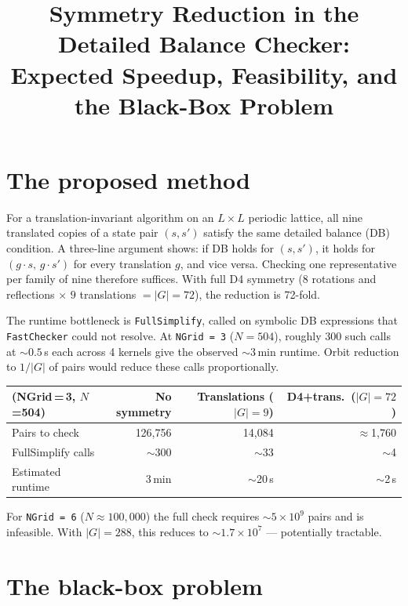 \documentclass[11pt,a4paper]{article}
\title{Symmetry Reduction in the Detailed Balance Checker:\\
\large Expected Speedup, Feasibility, and the Black-Box Problem}
\author{}
\date{}
\begin{document}
\maketitle

\section{The proposed method}

For a translation-invariant algorithm on an $L\times L$ periodic lattice,
all nine translated copies of a state pair $(s, s')$ satisfy the same
detailed balance (DB) condition.  A three-line argument shows: if DB holds
for $(s,s')$, it holds for $(g{\cdot}s,\,g{\cdot}s')$ for every
translation $g$, and vice versa.  Checking one representative per
family of nine therefore suffices.  With full D4 symmetry ($8$ rotations
and reflections $\times$ $9$ translations $= |G|=72$), the reduction is
72-fold.

The runtime bottleneck is \texttt{FullSimplify}, called on symbolic DB
expressions that \texttt{FastChecker} could not resolve.  At
\texttt{NGrid\,=\,3} ($N=504$), roughly 300 such calls at ${\sim}0.5$\,s
each across 4 kernels give the observed ${\sim}3$\,min runtime.  Orbit
reduction to $1/|G|$ of pairs would reduce these calls proportionally.

\begin{center}
\renewcommand{\arraystretch}{1.25}
\begin{tabular}{lrrr}
\toprule
(NGrid\,=\,3, $N$=504) & No symmetry & Translations ($|G|{=}9$) & D4+trans.\ ($|G|{=}72$) \\
\midrule
Pairs to check      & 126,756  & 14,084   & $\approx$1,760  \\
FullSimplify calls  & $\sim$300   & $\sim$33  & $\sim$4     \\
Estimated runtime   & 3\,min   & $\sim$20\,s & $\sim$2\,s  \\
\bottomrule
\end{tabular}
\end{center}

For \texttt{NGrid\,=\,6} ($N\approx100{,}000$) the full check requires
${\sim}5\times10^9$ pairs and is infeasible.  With $|G|{=}288$, this
reduces to ${\sim}1.7\times10^7$ --- potentially tractable.

\section{The black-box problem}
\end{document}
